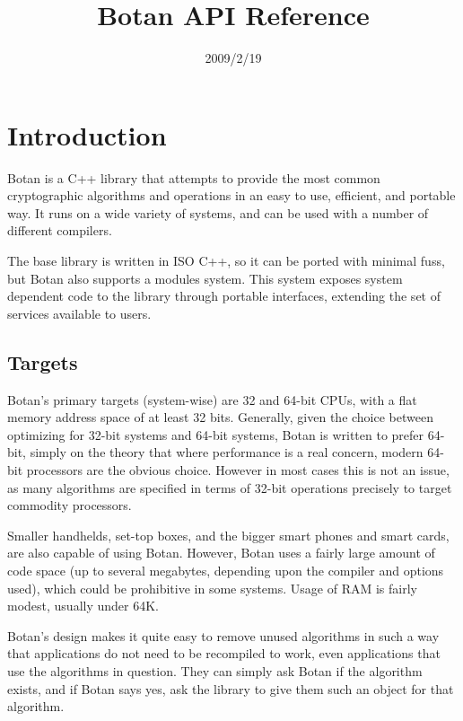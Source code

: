 \documentclass{article}
\title{\textbf{Botan API Reference}}
\author{}
\date{2009/2/19}
\begin{document}
\maketitle

\tableofcontents

\parskip=5pt

\pagebreak
\section{Introduction}

Botan is a C++ library that attempts to provide the most common
cryptographic algorithms and operations in an easy to use, efficient,
and portable way. It runs on a wide variety of systems, and can be
used with a number of different compilers.

The base library is written in ISO C++, so it can be ported with
minimal fuss, but Botan also supports a modules system. This system
exposes system dependent code to the library through portable
interfaces, extending the set of services available to users.

\subsection{Targets}

Botan's primary targets (system-wise) are 32 and 64-bit CPUs, with a
flat memory address space of at least 32 bits. Generally, given the
choice between optimizing for 32-bit systems and 64-bit systems, Botan
is written to prefer 64-bit, simply on the theory that where
performance is a real concern, modern 64-bit processors are the
obvious choice. However in most cases this is not an issue, as many
algorithms are specified in terms of 32-bit operations precisely to
target commodity processors.

Smaller handhelds, set-top boxes, and the bigger smart phones and smart
cards, are also capable of using Botan. However, Botan uses a fairly
large amount of code space (up to several megabytes, depending upon
the compiler and options used), which could be prohibitive in some
systems. Usage of RAM is fairly modest, usually under 64K.

Botan's design makes it quite easy to remove unused algorithms in such
a way that applications do not need to be recompiled to work, even
applications that use the algorithms in question. They can simply ask
Botan if the algorithm exists, and if Botan says yes, ask the library
to give them such an object for that algorithm.
\end{document}
